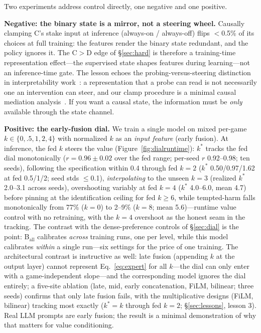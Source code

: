 \documentclass[11pt]{article}
\begin{document}
Two experiments address control directly, one negative and one positive.

\textbf{Negative: the binary state is a mirror, not a steering wheel.} Causally clamping C's stake input at inference (always-on / always-off) flips $<$0.5\% of its choices at full training: the features render the binary state redundant, and the policy ignores it. The C$>$D edge of \S\ref{sec:hard} is therefore a training-time representation effect---the supervised state shapes features during learning---not an inference-time gate. The lesson echoes the probing-versus-steering distinction in interpretability work~\cite{belinkov2022probing,vig2019investigating}: a representation that a probe can read is not necessarily one an intervention can steer, and our clamp procedure is a minimal causal mediation analysis~\cite{geiger2021causal}. If you want a causal state, the information must be \emph{only} available through the state channel.

\textbf{Positive: the early-fusion dial.} We train a single model on mixed per-game $k \in \{0, .5, 1, 2, 4\}$ with normalized $k$ as an \emph{input feature} (early fusion). At inference, the fed $k$ steers the value (Figure~\ref{fig:dialruntime}): $k^*$ tracks the fed dial monotonically ($r{=}0.96\pm0.02$ over the fed range; per-seed $r$ 0.92--0.98; ten seeds), following the specification within 0.4 through fed $k{=}2$ ($k^*$ 0.50/0.97/1.62 at fed 0.5/1/2; seed stds $\leq$0.1), \emph{interpolating} to the unseen $k{=}3$ (realized $k^*$ 2.0--3.1 across seeds), overshooting variably at fed $k{=}4$ ($k^*$ 4.0--6.0, mean 4.7) before pinning at the identification ceiling for fed $k\geq6$, while tempted-harm falls monotonically from 77\% ($k{=}0$) to 2--9\% ($k{=}8$; mean 5.6)---runtime value control with no retraining, with the $k{=}4$ overshoot as the honest seam in the tracking. The contrast with the dense-preference controls of \S\ref{sec:dial} is the point: B$_{\mathrm{all}}$ calibrates \emph{across} training runs, one per level, while this model calibrates \emph{within} a single run---six settings for the price of one training. The architectural contrast is instructive as well: late fusion (appending $k$ at the output layer) cannot represent Eq.~\eqref{eq:expert} for all $k$---the dial can only enter with a game-independent slope---and the corresponding model ignores the dial entirely; a five-site ablation (late, mid, early concatenation, FiLM, bilinear; three seeds) confirms that only late fusion fails, with the multiplicative designs (FiLM, bilinear) tracking most exactly ($k^*{=}k$ through fed $k{=}2$; \S\ref{sec:lessons}, lesson 3). Real LLM prompts are early fusion; the result is a minimal demonstration of why that matters for value conditioning.
\end{document}
